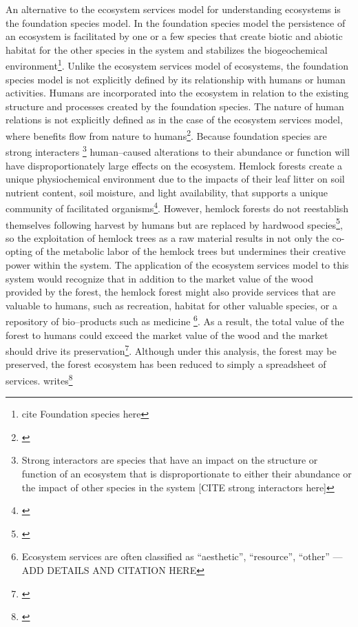 \documentclass{article}
\begin{document}
{An alternative to the ecosystem services model for understanding ecosystems is the foundation species model. In the foundation species model the persistence of an ecosystem is facilitated by one or a few species that create biotic and abiotic habitat for the other species in the system and stabilizes the biogeochemical environment\footnote{cite Foundation species here}. Unlike the ecosystem services model of ecosystems, the foundation species model is not explicitly defined by its relationship with humans or human activities. Humans are incorporated into the ecosystem in relation to the existing structure and processes created by the foundation species. The nature of human relations is not explicitly defined as in the case of the ecosystem services model, where benefits flow from nature to humans\footnote{\cite{costanza_value_1998}}. Because foundation species are strong interacters
\footnote{Strong interactors are species that have an impact on the structure or function of an ecosystem that is disproportionate to either their abundance or the impact of other species in the system [CITE strong interactors here]}
human--caused alterations to their abundance or function will have disproportionately large effects on the ecosystem. Hemlock forests create a unique physiochemical environment due to the impacts of their leaf litter on soil nutrient content, soil moisture, and light availability, that supports a unique community of facilitated organisms\footnote{\cite{ellison_2005}}. However, hemlock forests do not reestablish themselves following harvest by humans but are replaced by hardwood species\footnote{\cite{ellison_2005}}, so the exploitation of hemlock trees as a raw material results in not only the co-opting of the metabolic labor of the hemlock trees but undermines their creative power within the system. The application of the ecosystem services model to this system would recognize that in addition to the market value of the wood provided by the forest, the hemlock forest might also provide services that are valuable to humans, such as recreation, habitat for other valuable species, or a repository of bio--products such as medicine
\footnote{Ecosystem services are often classified as ``aesthetic'', ``resource'', ``other'' --- ADD DETAILS AND CITATION HERE}. 
As a result, the total value of the forest to humans could exceed the market value of the wood and the market should drive its preservation\footnote{\cite{costanza_value_1998}}. Although under this analysis, the forest may be preserved, the forest ecosystem has been reduced to simply a spreadsheet of services. \citeauthor{battistoni_bringing_2017} writes\footnote{\cite[p. 11]{battistoni_bringing_2017}}

}
\end{document}
